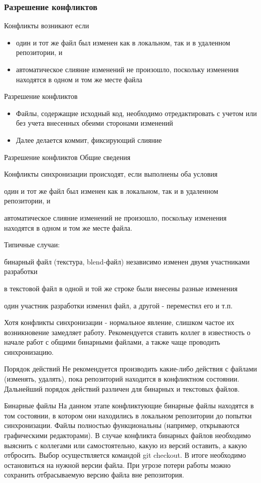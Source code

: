 \documentclass{../industrial-development}
\begin{document}
\begin{frame} \frametitle{Разрешение конфликтов}
Конфликты возникают если
  \begin{itemize}
  \item один и тот же файл был изменен как в локальном, так и в удаленном репозитории, и
  \item автоматическое слияние изменений не произошло, поскольку изменения находятся в одном и том же месте файла
  \end{itemize}
Разрешение конфликтов
  \begin{itemize}
  \item Файлы, содержащие исходный код, необходимо отредактировать с учетом или без учета внесенных обеими сторонами изменений
  \item Далее делается коммит, фиксирующий слияние
  \end{itemize}
\end{frame}

\lecturenotes

Разрешение конфликтов
Общие сведения

Конфликты синхронизации происходят, если выполнены оба условия

    один и тот же файл был изменен как в локальном, так и в удаленном репозитории, и

    автоматическое слияние изменений не произошло, поскольку изменения находятся в одном и том же месте файла.

Типичные случаи:

    бинарный файл (текстура, blend-файл) независимо изменен двумя участниками разработки

    в текстовой файл в одной и той же строке были внесены разные изменения

    один участник разработки изменил файл, а другой - переместил его и т.п.

Хотя конфликты синхронизации - нормальное явление, слишком частое их возникновение замедляет работу. Рекомендуется ставить коллег в известность о начале работ с общими бинарными файлами, а также чаще проводить синхронизацию.

Порядок действий
Не рекомендуется производить какие-либо действия с файлами (изменять, удалять), пока репозиторий находится в конфликтном состоянии.
Дальнейший порядок действий различен для бинарных и текстовых файлов.

Бинарные файлы
На данном этапе конфликтующие бинарные файлы находятся в том состоянии, в котором они находились в локальном репозитории до попытки синхронизации. Файлы полностью функциональны (например, открываются графическими редакторами).
В случае конфликта бинарных файлов необходимо выяснить с коллегами или самостоятельно, какую из версий оставить, а какую отбросить. Выбор осуществляется командой git checkout.
В итоге необходимо остановиться на нужной версии файла. При угрозе потери работы можно сохранить отбрасываемую версию файла вне репозитория.
\end{document}

